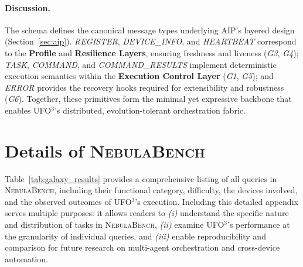 \documentclass[10pt]{article} %
\newcommand{\ufo}{\textsc{UFO}$^3$\xspace}
\newcommand{\bench}{\textsc{NebulaBench}\xspace}
\begin{document}
\paragraph{Discussion.}
The schema defines the canonical message types underlying AIP's layered design (Section~\ref{sec:aip}). 
\emph{REGISTER}, \emph{DEVICE\_INFO}, and \emph{HEARTBEAT} correspond to the \textbf{Profile} and \textbf{Resilience Layers}, ensuring freshness and liveness (\textit{G3}, \textit{G4}); 
\emph{TASK}, \emph{COMMAND}, and \emph{COMMAND\_RESULTS} implement deterministic execution semantics within the \textbf{Execution Control Layer} (\textit{G1}, \textit{G5}); 
and \emph{ERROR} provides the recovery hooks required for extensibility and robustness (\textit{G6}). 
Together, these primitives form the minimal yet expressive backbone that enables \ufo's distributed, evolution-tolerant orchestration fabric.


\section{Details of \bench}
\label{sec:bench_details}

Table~\ref{tab:galaxy_results} provides a comprehensive listing of all queries in \bench, including their functional category, difficulty, the devices involved, and the observed outcomes of \ufo's execution. Including this detailed appendix serves multiple purposes: it allows readers to \textit{(i)} understand the specific nature and distribution of tasks in \bench, \textit{(ii)} examine \ufo's performance at the granularity of individual queries, and \textit{(iii)} enable reproducibility and comparison for future research on multi-agent orchestration and cross-device automation.
\end{document}
